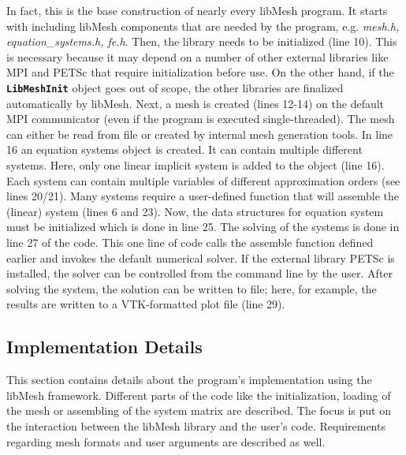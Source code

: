  In fact, this is the base construction of nearly every libMesh program. It starts with including libMesh components that are needed by the program, e.g. \textit{mesh.h, equation\_systems.h, fe.h}. Then, the library needs to be initialized (line 10). This is necessary because it may depend on a number of other external libraries like MPI and PETSc that require initialization before use. On the other hand, if the \texttt{\textbf{LibMeshInit}} object goes out of scope, the other libraries are finalized automatically by libMesh. Next, a mesh is created (lines 12-14) on the default MPI communicator (even if the program is executed single-threaded). The mesh can either be read from file or created by internal mesh generation tools. In line 16 an equation systems object is created. It can contain multiple different systems. Here, only one linear implicit system is added to the object (line 16). Each system can contain multiple variables of different approximation orders (see lines 20/21). Many systems require a user-defined function that will assemble the (linear) system (lines 6 and 23). Now, the data structures for equation system must be initialized which is done in line 25. The solving of the systems is done in line 27 of the code. This one line of code calls the assemble function defined earlier and invokes the default numerical solver. If the external library PETSc is installed, the solver can be controlled from the command line by the user. After solving the system, the solution can be written to file; here, for example, the results are written to a VTK-formatted plot file (line 29).
 
 \subsection{Implementation Details}\label{sec:Impl-Details}
  This section contains details about the program's implementation using the libMesh framework. Different parts of the code like the initialization, loading of the mesh or assembling of the system matrix are described. The focus is put on the interaction between the libMesh library and the user's code. Requirements regarding mesh formats and user arguments are described as well.

 
